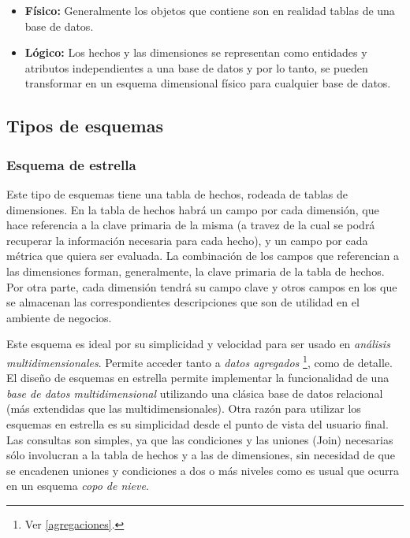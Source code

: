 \documentclass[a4paper,11pt]{article}
\begin{document}
    \begin{itemize}
      \item \textbf{Físico:} Generalmente los objetos que contiene son en realidad tablas de una base de datos.
      \item \textbf{Lógico:} Los hechos y las dimensiones se representan como entidades y atributos independientes a una base de datos y por lo tanto,
      se pueden transformar en un esquema dimensional físico para cualquier base de datos.
    \end{itemize}
    
    
    \subsection{Tipos de esquemas}
    
    \subsubsection{Esquema de estrella}
    
    Este tipo de esquemas tiene una tabla de hechos, rodeada de tablas de dimensiones. En la tabla de hechos habrá un campo por cada dimensión, que
    hace referencia a la clave primaria de la misma (a travez de la cual se podrá recuperar la información necesaria para cada hecho),
    y un campo por cada métrica que quiera ser evaluada. La combinación de los campos que referencian a las dimensiones forman, generalmente, la clave primaria de la
    tabla de hechos. Por otra parte, cada dimensión tendrá su campo clave y otros campos en los que se almacenan las correspondientes descripciones que son 
    de utilidad en el ambiente de negocios.
    
    Este esquema es ideal por su simplicidad y velocidad para ser usado en \textit{análisis multidimensionales}. Permite 
    acceder tanto a \textit{datos agregados} \footnote{Ver \ref{agregaciones}.}, como de detalle.
    El diseño de esquemas en estrella permite implementar la funcionalidad de una \textit{base de datos 
    multidimensional} utilizando una clásica base de datos relacional (más extendidas que las multidimensionales). Otra razón para utilizar los esquemas en 
    estrella es su simplicidad desde el punto de vista del usuario final. Las consultas son simples, ya que las condiciones y las uniones (Join) 
    necesarias sólo involucran a la tabla de hechos y a las de dimensiones, sin necesidad de que se encadenen uniones y condiciones a dos o más niveles como 
    es usual que ocurra en un esquema \textit{copo de nieve}.
    
\end{document}
